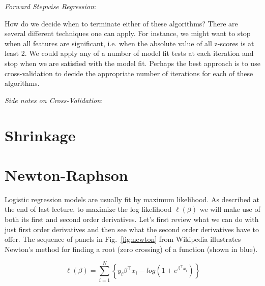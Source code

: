 \documentclass[a4paper]{article}
\begin{document}
 \emph{Forward Stepwise Regression}:
 
 How do we decide when to terminate either of these algorithms?  There are several different techniques one can apply.  For instance, we might want to stop when all features are significant, i.e. when the absolute value of all z-scores is at least 2.  We could apply any of a number of model fit tests at each iteration and stop when we are satisfied with the model fit.  Perhaps the best approach is to use cross-validation to decide the appropriate number of iterations for each of these algorithms.  
 
 \emph{Side notes on Cross-Validation}:
 
 
 

\section{Shrinkage}





\clearpage
{}
\section{Newton-Raphson}
Logistic regression models are usually fit by maximum likelihood. As described at the end of last lecture, to maximize the log likelihood $\ell(\beta)$ we will make use of both its first and second order derivatives.  Let's first review what we can do with just first order derivatives and then see what the second order derivatives have to offer.
The sequence of panels in Fig.\ \ref{fig:newton} from Wikipedia illustrates Newton's method for finding a root (zero crossing) of a function (shown in blue). 

\begin{equation}
\ell(\beta) = \sum_{i=1}^N \left \{ y_i \beta ^\top x_i -  log(1+ e^{\beta ^\top x_i}) \right \}
\label{eqn:llgrad}
	\end{equation}
    
\end{document}

